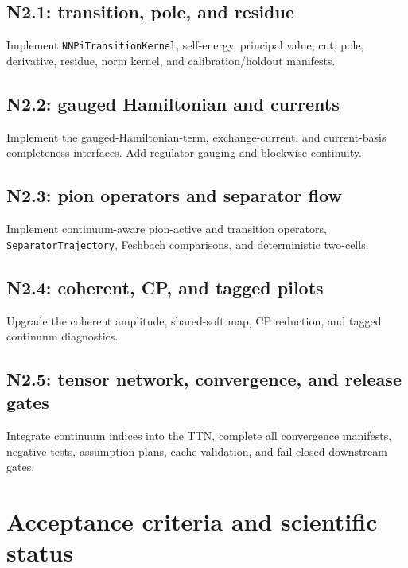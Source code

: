 \documentclass[11pt]{article}
\newcommand{\TransitionKernel}{\texttt{NNPi\allowbreak Transition\allowbreak Kernel}}
\newcommand{\SeparatorTrajectory}{\texttt{Separator\allowbreak Trajectory}}
\begin{document}
\subsection{N2.1: transition, pole, and residue}

Implement \TransitionKernel, self-energy, principal value, cut, pole,
derivative, residue, norm kernel, and calibration/holdout manifests.

\subsection{N2.2: gauged Hamiltonian and currents}

Implement the gauged-Hamiltonian-term, exchange-current, and current-basis
completeness interfaces.  Add regulator gauging and blockwise continuity.

\subsection{N2.3: pion operators and separator flow}

Implement continuum-aware pion-active and transition operators,
\SeparatorTrajectory, Feshbach comparisons, and deterministic two-cells.

\subsection{N2.4: coherent, CP, and tagged pilots}

Upgrade the coherent amplitude, shared-soft map, CP reduction, and tagged
continuum diagnostics.

\subsection{N2.5: tensor network, convergence, and release gates}

Integrate continuum indices into the TTN, complete all convergence manifests,
negative tests, assumption plans, cache validation, and fail-closed downstream
gates.

\section{Acceptance criteria and scientific status}
\label{sec:acceptance}
\end{document}
